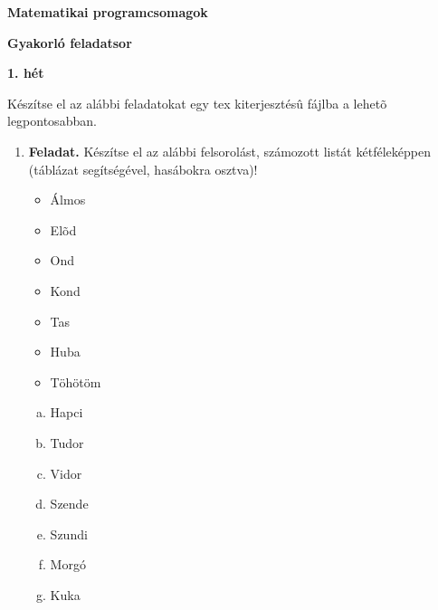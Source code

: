 \documentclass[12pt,a4paper]{article}
\begin{document}
\pagestyle{empty}
\noindent

\begin{center}
    \textbf{Matematikai programcsomagok}
    \par
    \textbf{Gyakorló feladatsor}
    \par
    \textbf{1. hét}
    \par
\end{center}

Készítse el az alábbi feladatokat egy tex kiterjesztésû fájlba a lehetõ legpontosabban.
\par
\begin{enumerate}
\item
\textbf{Feladat.}
Készítse el az alábbi felsorolást, számozott listát kétféleképpen (táblázat segítségével, hasábokra osztva)!
\begin{multicols}{2}
    \begin{itemize}
        \item Álmos
        \item Elõd
        \item Ond
        \item Kond
        \item Tas
        \item Huba
        \item Töhötöm
    \end{itemize}
    \begin{enumerate}[a.)]
        \item Hapci
        \item Tudor
        \item Vidor
        \item Szende
        \item Szundi
        \item Morgó
        \item Kuka
    \end{enumerate}
\end{multicols}
\end{enumerate}
\end{document}
